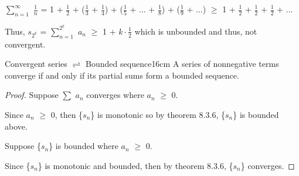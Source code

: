     \begin{tbox}
        $\sum_{n=1}^{\infty}$ $\frac{1}{n}$
        = 1 + $\frac{1}{2}$ + ($\frac{1}{3}$ + $\frac{1}{4}$)
        + ($\frac{1}{5}$ + ... + $\frac{1}{8}$) + ($\frac{1}{9}$ + ...)
        $\geq$ 1 + $\frac{1}{2}$ + $\frac{1}{2}$ + $\frac{1}{2}$ + ...

        Thus, $s_{2^k}$ = $\sum_{n=1}^{2^k}$ $a_n$
        $\geq$ 1 + $k \cdot \frac{1}{2}$
        which is unbounded and thus, not convergent.
    \end{tbox}
    
    \vspace{0.5cm}



    \begin{wtheorem}{Convergent series $\rightleftharpoons$ Bounded sequence}{16cm}
        A series of nonnegative terms converge if and only if
        its partial sums form a bounded sequence.
    \end{wtheorem}

    \begin{proof}
        Suppose $\sum$ $a_n$ converges where $a_n$ $\geq$ 0.

        Since $a_n$ $\geq$ 0, then \{$s_n$\} is monotonic so
        by {\color{red} theorem 8.3.6}, \{$s_n$\} is bounded above.

        \vspace{0.2cm}

        Suppose \{$s_n$\} is bounded where $a_n$ $\geq$ 0.

        Since \{$s_n$\} is monotonic and bounded, then
        by {\color{red} theorem 8.3.6}, \{$s_n$\} converges.
    \end{proof}

    \newpage    



